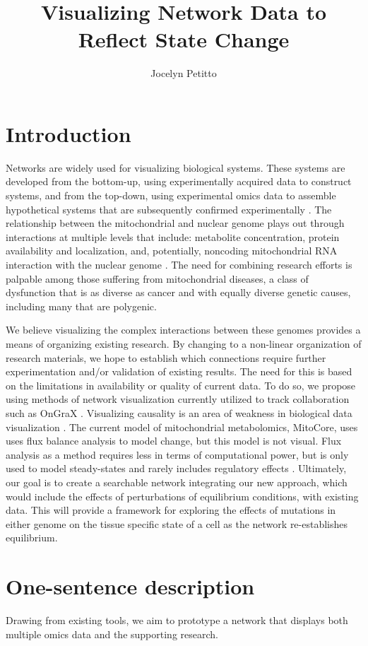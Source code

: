 \documentclass{proc}	%
\title{Visualizing Network Data to Reflect State Change}
\author{Jocelyn Petitto}
\begin{document}
\maketitle
\section{Introduction}
Networks are widely used for visualizing biological systems. These systems are developed from the bottom-up, using experimentally acquired data to construct systems, and from the top-down, using experimental omics data to assemble hypothetical systems that are subsequently confirmed experimentally \cite{Go2018}. The relationship between the mitochondrial and nuclear genome plays out through interactions at multiple levels that include: metabolite concentration, protein availability and localization, and, potentially, noncoding mitochondrial RNA interaction with the nuclear genome \cite{Vendramin2017}.  The need for combining research efforts is palpable among those suffering from mitochondrial diseases, a class of dysfunction that is as diverse as cancer and with equally diverse genetic causes, including many that are polygenic.

We believe visualizing the complex interactions between these genomes provides a means of organizing existing research. By changing to a non-linear organization of research materials, we hope to establish which connections require further experimentation and/or validation of existing results. The need for this is based on the limitations in availability or quality of current data. To do so, we propose using methods of network visualization currently utilized to track collaboration such as OnGraX \cite{Zimmer2017}.
Visualizing causality is an area of weakness in biological data visualization \cite{Murray2017}. The current model of mitochondrial metabolomics, MitoCore, uses \cite{Smith2017} uses flux balance analysis to model change, but this model is not visual. Flux analysis as a method requires less in terms of computational power, but is only used to model steady-states and rarely includes regulatory effects \cite{Orth2010}. Ultimately, our goal is to create a searchable network integrating our new approach, which would include the effects of perturbations of equilibrium conditions, with existing data. This will provide a framework for exploring the effects of mutations in either genome on the tissue specific state of a cell as the network re-establishes equilibrium.
\section{One-sentence description}
Drawing from existing tools, we aim to prototype a network that displays both multiple omics data and the supporting research.
\end{document}
